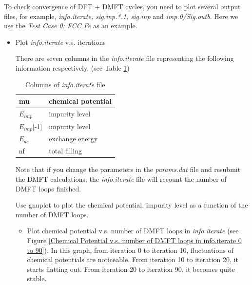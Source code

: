 \documentclass[12 pt]{article}
\begin{document}
  To check convergence of DFT + DMFT cycles, you need to plot several output files, for example, 
\emph{info.iterate, sig.inp.*.1, sig.inp} and \emph{imp.0/Sig.outb}. Here we use the \emph{Test Case 0: FCC Fe} as 
an example.

	  \begin{itemize}[leftmargin=0.2in]

	    \item Plot \emph{info.iterate} v.s. iterations

  There are seven columns in the \emph{info.iterate} file representing the following information respectively, 
(see Table \ref{Columns of info.iterate file})

	      \begin{table}[ht]
		\centering
		\caption{Columns of \emph{info.iterate} file}
		\label{Columns of info.iterate file}
		\vspace{2ex}
		
		  \begin{tabular}{|l|l|}
		   \hline
		  mu      	&  chemical potential\\ \hline

		  $E_{imp}$	&  impurity level\\ \hline

		  $E_{imp}$[-1] &  impurity level\\ \hline

		  $E_{dc}$	&  exchange energy\\ \hline

		  nf		&  total filling\\ \hline

		  \end{tabular}

	      \end{table}

  Note that if you change the parameters in the \emph{params.dat} file and resubmit the DMFT calculations, the 
\emph{info.iterate} file will recount the number of DMFT loops finished.

  Use gnuplot to plot the chemical potential, impurity level as a function of the number of DMFT loops. 

		  \begin{itemize}[leftmargin=0.5in]

		  \item Plot chemical potential v.s. number of DMFT loops in \emph{info.iterate} (see Figure 
\ref{Chemical Potential v.s. number of DMFT loops in info.iterate 0 to 90}). In this graph, from iteration 0 to 
iteration 10, fluctuations of chemical potentials are noticeable. From iteration 10 to iteration 20, it starts 
flatting out. From iteration 20 to iteration 90, it becomes quite stable.


\end{itemize}
\end{itemize}
\end{document}
